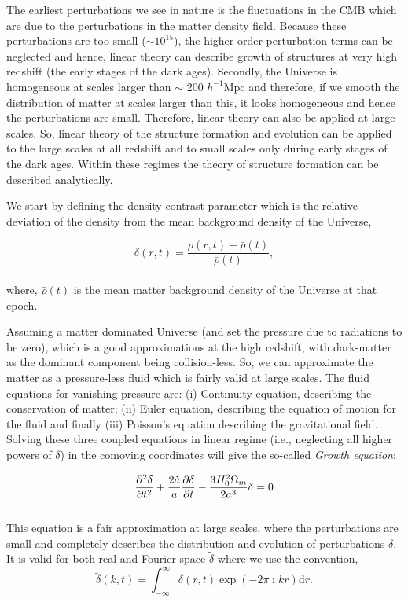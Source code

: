 The earliest perturbations we see in nature is the fluctuations in the
CMB which are due to the perturbations in the matter density
field. Because these perturbations are too small ($\sim 10^{15}$), 
the higher order perturbation
terms can be neglected and hence, linear theory can describe growth of structures
at very high redshift (the early stages of the dark ages). 
Secondly, the Universe is homogeneous at scales larger than
$\sim$ 200 $h^{-1} \mathrm{Mpc}$ and therefore, if we smooth the distribution
of matter at scales larger than this, it looks homogeneous and hence the perturbations
are small. Therefore, linear theory can also be applied at large scales. 
So, linear theory of the structure formation and evolution can be applied
to the large scales at all redshift and to small scales only during
early stages of the dark ages. 
Within these regimes the theory of structure formation can be
described analytically.

We start by defining the density contrast parameter which is the relative 
deviation of the density from the mean background density of the Universe,

\begin{equation}
	\delta(r,t) = \dfrac{\rho(r,t) - \bar{\rho}(t)}{\bar{\rho}(t)},
\end{equation}
\\
where, $\bar{\rho}(t)$ is the mean matter background density 
of the Universe at that epoch. 

Assuming a matter dominated Universe (and set the pressure due to radiations
to be zero), which is a good approximations at the
high redshift, with dark-matter as the dominant component being collision-less. 
So, we can approximate the matter as a pressure-less fluid which is fairly 
valid at large scales. The fluid equations for vanishing pressure are: 
(i) Continuity equation, describing the conservation of matter; (ii) Euler
equation, describing the equation of motion for the fluid and finally (iii) 
Poisson's equation describing the gravitational field. Solving these three coupled
equations in linear regime (i.e., neglecting all higher powers of $\delta$) in 
the comoving coordinates will give
the so-called {\it Growth equation}:

\begin{equation}
\centering
\dfrac{\partial^2 {\delta}}{\partial t^2} + \dfrac{2\dot{a}}{a} 
		\dfrac{\partial {\delta}}{\partial t}
		- \dfrac{3H_0^2 \Omega_m}{2a^3} {\delta} = 0
		\label{eqn:growth}
\end{equation}
\\
This equation is a fair approximation at large scales, where the perturbations
are small and completely describes the distribution and evolution of perturbations $\delta$. 
It is valid for both real and Fourier space $\tilde{\delta}$ where we use the convention,
\begin{equation}
	\tilde{\delta}(k,t) = \int_{-\infty}^{\infty} \delta(r,t) \exp(-2\pi \imath kr) \mathrm{d}r.
\end{equation}

